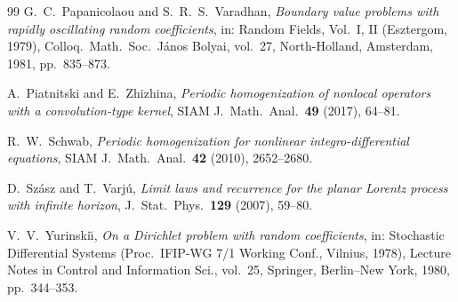 \documentclass[11pt]{amsart}
\numberwithin{equation}{section}
\begin{document}
\begin{thebibliography}{99}
G.~C.~Papanicolaou and S.~R.~S.~Varadhan,
\emph{Boundary value problems with rapidly oscillating random coefficients},
in: Random Fields, Vol.~I, II (Esztergom, 1979), Colloq.\ Math.\ Soc.\ J\'anos Bolyai, vol.~27, North-Holland, Amsterdam, 1981, pp.~835--873.

A.~Piatnitski and E.~Zhizhina,
\emph{Periodic homogenization of nonlocal operators with a convolution-type kernel},
SIAM J.\ Math.\ Anal.\ \textbf{49} (2017), 64--81.

R.~W.~Schwab,
\emph{Periodic homogenization for nonlinear integro-differential equations},
SIAM J.\ Math.\ Anal.\ \textbf{42} (2010), 2652--2680.

D.~Sz\'asz and T.~Varj\'u,
\emph{Limit laws and recurrence for the planar Lorentz process with infinite horizon},
J.\ Stat.\ Phys.\ \textbf{129} (2007), 59--80.

V.~V.~Yurinski\u{\i},
\emph{On a Dirichlet problem with random coefficients},
in: Stochastic Differential Systems (Proc.\ IFIP-WG 7/1 Working Conf., Vilnius, 1978), Lecture Notes in Control and Information Sci., vol.~25, Springer, Berlin--New York, 1980, pp.~344--353.

\end{thebibliography}
\end{document}
